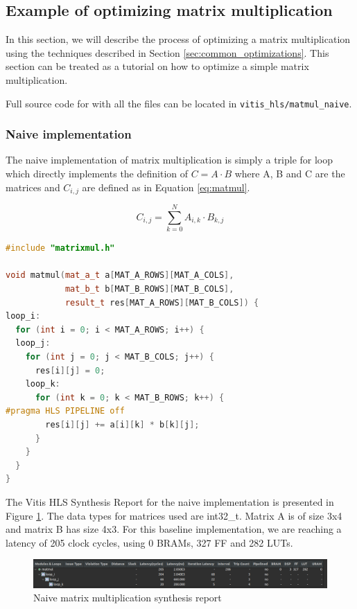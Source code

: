 \documentclass[a4paper, twoside]{report}
\theoremstyle{definition}
\numberwithin{equation}{section}
\begin{document}
\subsection{Example of optimizing matrix multiplication}

In this section, we will describe the process of optimizing a matrix multiplication
using the techniques described in Section \ref{sec:common_optimizations}.
This section can be treated as a tutorial on how to optimize a simple matrix multiplication.

Full source code for with all the files can be located in \texttt{vitis\_hls/matmul\_naive}.

\subsubsection{Naive implementation}

The naive implementation of matrix multiplication is simply a triple for loop
which directly implements the definition of $C = A \cdot B$ where A, B and C are the matrices
and $C_{i,j}$ are defined as in Equation \ref{eq:matmul}.

\begin{equation} \label{eq:matmul}
    C_{i,j} = \sum_{k=0}^{N} A_{i,k} \cdot B_{k,j}
\end{equation}


\begin{lstlisting}[language=c++,numbers=none]
#include "matrixmul.h"

void matmul(mat_a_t a[MAT_A_ROWS][MAT_A_COLS],
            mat_b_t b[MAT_B_ROWS][MAT_B_COLS],
            result_t res[MAT_A_ROWS][MAT_B_COLS]) {
loop_i:
  for (int i = 0; i < MAT_A_ROWS; i++) {
  loop_j:
    for (int j = 0; j < MAT_B_COLS; j++) {
      res[i][j] = 0;
    loop_k:
      for (int k = 0; k < MAT_B_ROWS; k++) {
#pragma HLS PIPELINE off
        res[i][j] += a[i][k] * b[k][j];
      }
    }
  }
}
\end{lstlisting}


The Vitis HLS Synthesis Report for the naive implementation is presented in Figure \ref{fig:matmul_naive_synth}.
The data types for matrices used are int32\_t. Matrix A is of size 3x4 and matrix B has size 4x3.
For this baseline implementation, we are reaching a latency of 205 clock cycles, using 0 BRAMs, 327 FF and 282 LUTs.


\begin{figure}[h!]
    \centering
    \includegraphics[width=\textwidth]{matmul_naive_synth.png}
    \caption{Naive matrix multiplication synthesis report}
    \label{fig:matmul_naive_synth}
\end{figure}
\end{document}
